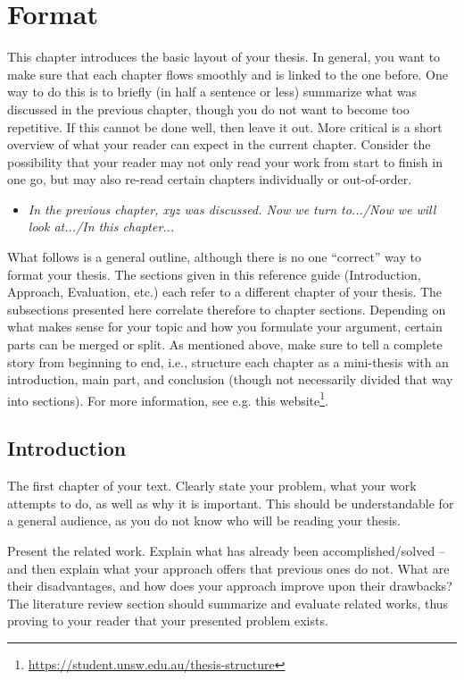 \chapter{Format} \label{ch:format}
This chapter introduces the basic layout of your thesis. In general, you want to make sure that each chapter flows smoothly and is linked to the one before. One way to do this is to briefly (in half a sentence or less) summarize what was discussed in the previous chapter, though you do not want to become too repetitive. If this cannot be done well, then leave it out. More critical is a short overview of what your reader can expect in the current chapter. Consider the possibility that your reader may not only read your work from start to finish in one go, but may also re-read certain chapters individually or out-of-order. 

\begin{itemize}
	\item \textit{In the previous chapter, xyz was discussed. Now we turn to.../Now we will look at.../In this chapter...}
\end{itemize}

What follows is a general outline, although there is no one ``correct'' way to format your thesis. The sections given in this reference guide (Introduction, Approach, Evaluation, etc.) each refer to a different chapter of your thesis. The subsections presented here correlate therefore to chapter sections. Depending on what makes sense for your topic and how you formulate your argument, certain parts can be merged or split. As mentioned above, make sure to tell a complete story from beginning to end, i.e., structure each chapter as a mini-thesis with an introduction, main part, and conclusion (though not necessarily divided that way into sections). For more information, see e.g. this website\footnote{\url{https://student.unsw.edu.au/thesis-structure}}.


\section{Introduction} \label{sec:intro}
The first chapter of your text. Clearly state your problem, what your work attempts to do, as well as why it is important. This should be understandable for a general audience, as you do not know who will be reading your thesis. 

Present the related work. Explain what has already been accomplished/solved -- and then explain what your approach offers that previous ones do not. What are their disadvantages, and how does your approach improve upon their drawbacks? The literature review section should summarize and evaluate related works, thus proving to your reader that your presented problem exists.

